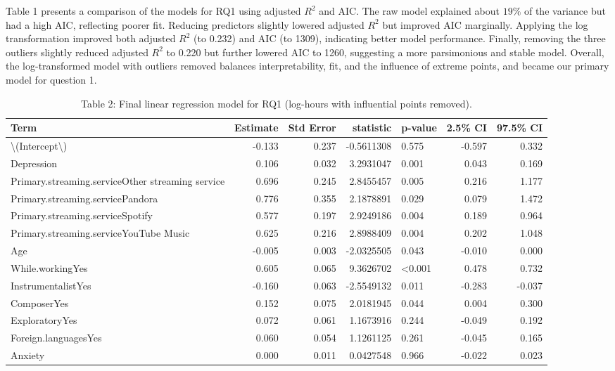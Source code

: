 \documentclass[
  letterpaper,
  DIV=11,
  numbers=noendperiod]{scrartcl}
\begin{document}
Table 1 presents a comparison of the models for RQ1 using adjusted
\(R^2\) and AIC. The raw model explained about \(19\%\) of the variance
but had a high AIC, reflecting poorer fit. Reducing predictors slightly
lowered adjusted \(R^2\) but improved AIC marginally. Applying the log
transformation improved both adjusted \(R^2\) (to 0.232) and AIC (to
1309), indicating better model performance. Finally, removing the three
outliers slightly reduced adjusted \(R^2\) to 0.220 but further lowered
AIC to 1260, suggesting a more parsimonious and stable model. Overall,
the log-transformed model with outliers removed balances
interpretability, fit, and the influence of extreme points, and became
our primary model for question 1.

\begin{longtable}[t]{lrrrlrr}
\caption{Table 2: Final linear regression model for RQ1 (log-hours with influential points removed).}\\
\toprule
Term & Estimate & Std Error & statistic & p-value & 2.5\% CI & 97.5\% CI\\
\midrule
\textbackslash{}(Intercept\textbackslash{}) & -0.133 & 0.237 & -0.5611308 & 0.575 & -0.597 & 0.332\\
Depression & 0.106 & 0.032 & 3.2931047 & 0.001 & 0.043 & 0.169\\
Primary.streaming.serviceOther streaming service & 0.696 & 0.245 & 2.8455457 & 0.005 & 0.216 & 1.177\\
Primary.streaming.servicePandora & 0.776 & 0.355 & 2.1878891 & 0.029 & 0.079 & 1.472\\
Primary.streaming.serviceSpotify & 0.577 & 0.197 & 2.9249186 & 0.004 & 0.189 & 0.964\\
\addlinespace
Primary.streaming.serviceYouTube Music & 0.625 & 0.216 & 2.8988409 & 0.004 & 0.202 & 1.048\\
Age & -0.005 & 0.003 & -2.0325505 & 0.043 & -0.010 & 0.000\\
While.workingYes & 0.605 & 0.065 & 9.3626702 & <0.001 & 0.478 & 0.732\\
InstrumentalistYes & -0.160 & 0.063 & -2.5549132 & 0.011 & -0.283 & -0.037\\
ComposerYes & 0.152 & 0.075 & 2.0181945 & 0.044 & 0.004 & 0.300\\
\addlinespace
ExploratoryYes & 0.072 & 0.061 & 1.1673916 & 0.244 & -0.049 & 0.192\\
Foreign.languagesYes & 0.060 & 0.054 & 1.1261125 & 0.261 & -0.045 & 0.165\\
Anxiety & 0.000 & 0.011 & 0.0427548 & 0.966 & -0.022 & 0.023\\

\end{longtable}
\end{document}
